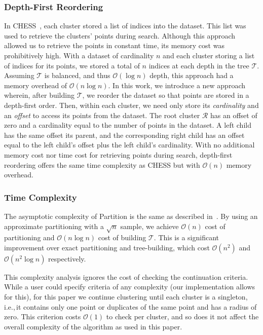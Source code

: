 \subsubsection{Depth-First Reordering}
\label{sec:methods:clustering:depth-first-reordering}

In CHESS~\cite{ishaq2019clustered}, each cluster stored a list of indices into the dataset.
This list was used to retrieve the clusters' points during search.
Although this approach allowed us to retrieve the points in constant time, its memory cost was prohibitively high.
With a dataset of cardinality $n$ and each cluster storing a list of indices for its points, we stored a total of $n$ indices at each depth in the tree $\mathcal{T}$.
Assuming $\mathcal{T}$ is balanced, and thus $\mathcal{O}(\log n)$ depth, this approach had a memory overhead of $\mathcal{O}(n \log n)$.
In this work, we introduce a new approach wherein, after building $\mathcal{T}$, we reorder the dataset so that points are stored in a depth-first order.
Then, within each cluster, we need only store its \textit{cardinality} and an \textit{offset} to access its points from the dataset.
The root cluster $\mathcal{R}$ has an offset of zero and a cardinality equal to the number of points in the dataset.
A left child has the same offset its parent, and the corresponding right child has an offset equal to the left child's offset plus the left child's cardinality.
With no additional memory cost nor time cost for retrieving points during search, depth-first reordering offers the same time complexity as CHESS but with $\mathcal{O}(n)$ memory overhead.


\subsubsection{Time Complexity}
\label{sec:methods:clustering:complexity}

The asymptotic complexity of Partition is the same as described in~\cite{ishaq2019clustered}.
By using an approximate partitioning with a $\sqrt{n}$ sample, we achieve $\mathcal{O}(n)$ cost of partitioning and $\mathcal{O}(n \log n)$ cost of building $\mathcal{T}$.
This is a significant improvement over exact partitioning and tree-building, which cost $\mathcal{O}(n^2)$ and $\mathcal{O}(n^2 \log n)$ respectively.

This complexity analysis ignores the cost of checking the continuation criteria.
While a user could specify criteria of any complexity (our implementation allows for this), for this paper we continue clustering until each cluster is a singleton, i.e.,\,it contains only one point or duplicates of the same point and has a radius of zero.
This criterion costs $\mathcal{O}(1)$ to check per cluster, and so does it not affect the overall complexity of the algorithm as used in this paper.

